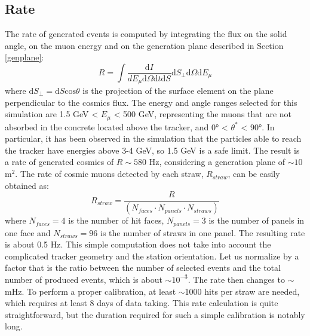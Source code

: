\subsection{Rate}\label{ratetracker}
The rate of generated events is computed by integrating the flux on the solid angle, on the muon energy and on the generation plane described in Section \ref{genplane}:
\begin{equation}
   R= \int \frac{\text{d} I}{d E_\mu \text{d} \Omega \text{d} t \text{d} S} \text{d} S_{\perp} \text{d} \Omega \text{d} E_\mu
    \end{equation}
where $\text{d}S_\perp= \text{d}S \text{cos}\theta$ is the projection of the surface element on the plane perpendicular to the cosmics flux. 
The energy and angle ranges selected for this simulation are 1.5 GeV < $E_\mu$ < 500 GeV, representing the 
muons that are not absorbed in the concrete located above the tracker, and 0° < $\theta^*$ < 90°. In particular, 
it has been observed in the simulation that the particles able to reach the tracker have energies above 3-4 GeV, so 1.5 GeV is a safe limit. 
The result is a rate of generated cosmics of $R \sim 580$ Hz, considering a generation plane of $\sim 10$ m$^2$. 
The rate of cosmic muons detected by each straw, $R_{straw}$, can be easily obtained as:
\begin{equation}
    R_{straw}=\frac{R}{(N_{faces}\cdot N_{panels}\cdot N_{straws} )}
\end{equation}
where $N_{faces}=4$ is the number of hit faces, $N_{panels}=3$ is the number of panels in one face and $N_{straws}=96$ is the number of straws in one panel.
The resulting rate is about 0.5 Hz. This simple computation does not take into account the complicated tracker geometry and the station orientation.
Let us normalize by a factor that is the ratio between the number of selected events and the total number of produced events, which is about 
$\sim10^{-3}$. The rate then changes to $\sim$ mHz. 
To perform a proper calibration, at least $\sim$1000 hits per straw are needed, which requires at least 8 days of data taking.
This rate calculation is quite straightforward, but the duration required for such a simple calibration is notably long.
